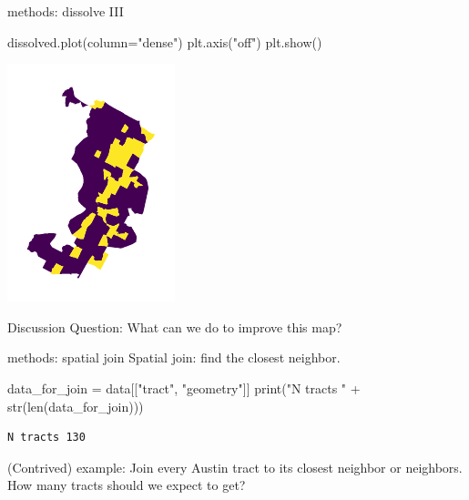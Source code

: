 \documentclass[
  ignorenonframetext,
]{beamer}
\newenvironment{Shaded}{\begin{snugshade}}{\end{snugshade}}
\newcommand{\BuiltInTok}[1]{\textcolor[rgb]{0.00,0.23,0.31}{#1}}
\newcommand{\NormalTok}[1]{\textcolor[rgb]{0.00,0.23,0.31}{#1}}
\newcommand{\OperatorTok}[1]{\textcolor[rgb]{0.37,0.37,0.37}{#1}}
\newcommand{\StringTok}[1]{\textcolor[rgb]{0.13,0.47,0.30}{#1}}
\begin{document}
\begin{frame}[fragile]{methods: dissolve III}
\label{methods-dissolve-iii}
\begin{Shaded}
\begin{Highlighting}[]
\NormalTok{dissolved.plot(column}\OperatorTok{=}\StringTok{"dense"}\NormalTok{)}
\NormalTok{plt.axis(}\StringTok{"off"}\NormalTok{)}
\NormalTok{plt.show()}
\end{Highlighting}
\end{Shaded}

\includegraphics{spatial_2_files/figure-beamer/cell-27-output-1.pdf}

Discussion Question: What can we do to improve this map?
\end{frame}

\begin{frame}[fragile]{methods: spatial join}
\label{methods-spatial-join}
Spatial join: find the closest neighbor.

\begin{Shaded}
\begin{Highlighting}[]
\NormalTok{data\_for\_join }\OperatorTok{=}\NormalTok{ data[[}\StringTok{"tract"}\NormalTok{, }\StringTok{"geometry"}\NormalTok{]]}
\BuiltInTok{print}\NormalTok{(}\StringTok{"N tracts "} \OperatorTok{+} \BuiltInTok{str}\NormalTok{(}\BuiltInTok{len}\NormalTok{(data\_for\_join)))}
\end{Highlighting}
\end{Shaded}

\begin{verbatim}
N tracts 130
\end{verbatim}

(Contrived) example: Join every Austin tract to its closest neighbor or
neighbors. How many tracts should we expect to get?
\end{frame}
\end{document}
